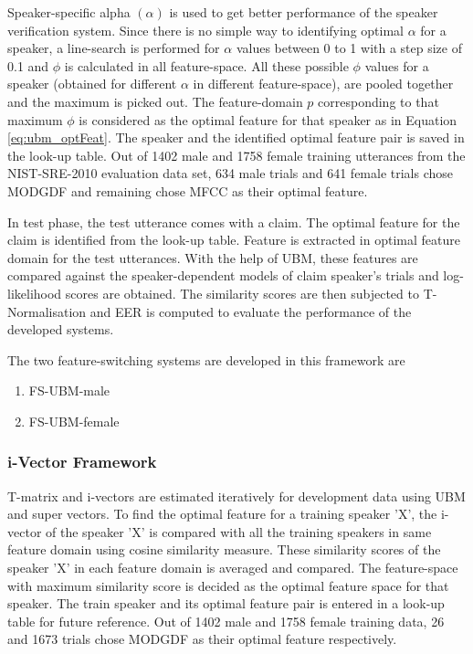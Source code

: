 \documentclass{article}
\begin{document}
\vspace{0.25 cm}	
Speaker-specific alpha $(\alpha)$ is used to get better performance of the speaker verification system. Since there is no simple way to identifying optimal $\alpha$ for a speaker, a line-search is performed for $\alpha$ values between 0 to 1 with a step size of 0.1 and $\phi$ is calculated in all feature-space. All these possible $\phi$ values for a speaker (obtained for different $\alpha$ in different feature-space), are pooled together and the maximum is picked out. The feature-domain $p$ corresponding to that maximum $\phi$ is considered as the optimal feature for that speaker as in Equation \ref{eq:ubm_optFeat}. The speaker and the identified optimal feature pair is saved in the look-up table. Out of 1402 male  and 1758 female training utterances from the NIST-SRE-2010 evaluation data set, 634 male trials and 641 female trials chose MODGDF and remaining chose MFCC as their optimal feature.

\vspace{0.25 cm}	
In test phase, the test utterance comes with a claim. The optimal feature for the claim is identified from the look-up table. Feature is extracted in optimal feature domain for the test utterances. With the help of UBM, these features are compared against the speaker-dependent models of claim speaker's trials and log-likelihood scores are obtained. The similarity scores are then subjected to T-Normalisation and EER is computed to evaluate the performance of the developed systems. 


\vspace{0.25 cm}
The two feature-switching systems are developed in this framework are
\begin{enumerate}
\item FS-UBM-male 
\item FS-UBM-female
\end{enumerate}


\subsubsection{i-Vector Framework}
\label{subsubsec:fs_ivec} 


T-matrix and i-vectors are estimated iteratively for development data using UBM and super vectors.  To find the optimal feature for a training speaker 'X', the i-vector of the speaker 'X' is compared with all the training speakers in same feature domain using cosine similarity measure. These similarity scores of the speaker 'X' in each feature domain is averaged and compared. The feature-space with maximum similarity score is decided as the optimal feature space for that speaker. The train speaker and its optimal feature pair is entered in a look-up table for future reference. Out of 1402 male and 1758 female training data, 26 and 1673 trials chose MODGDF as their optimal feature respectively.
\end{document}
